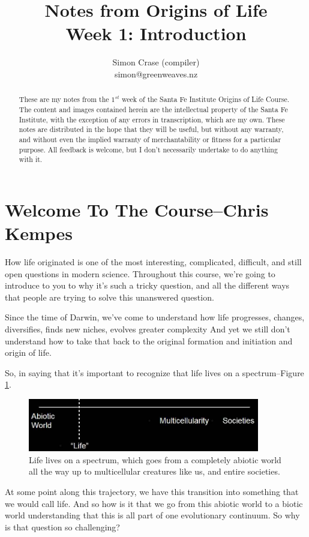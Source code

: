 \documentclass[]{article}
\title{
	Notes from Origins of Life\\
	Week 1: Introduction
}
\author{Simon Crase (compiler)\\simon@greenweaves.nz}
\begin{document}
\maketitle

\begin{abstract}
    These are my notes from the $1^{st}$ week of the Santa Fe Institute Origins of Life Course\cite{sfi2020}.\\
    The content and images contained herein are the intellectual property of the Santa Fe Institute, with the exception of any errors in transcription, which are my own.
    These notes are distributed in the hope that they will be useful,
    but without any warranty, and without even the implied warranty of
     merchantability or fitness for a particular purpose. All feedback is welcome,
    but I don't necessarily undertake to do anything with it.
\end{abstract}

\setcounter{tocdepth}{2}
\tableofcontents
\listoffigures

\section[Welcome To The Course]{Welcome To The Course--Chris Kempes}

How life originated is one of the most interesting, complicated, difficult, and still open questions in modern science. Throughout this course, we're going to
introduce to you to why it's such a tricky question, and all the different ways that people are trying to solve this unanswered question.	

Since the time of Darwin, we've come to understand how life progresses, changes, diversifies, finds new niches, evolves greater complexity And yet we still don't understand how to take that back to the original formation and initiation and origin of life.

So, in saying that it's important to recognize that life lives on a spectrum--Figure \ref{fig:lifesTransitions}.

\begin{figure}[H]
	\caption[Life lives on a spectrum]{Life lives on a spectrum, which goes from a completely abiotic world
		all the way up to multicellular creatures like us, and entire societies.}\label{fig:lifesTransitions}
	\includegraphics[width=0.9\textwidth]{lifesTransitions}
\end{figure}
At some point along this trajectory, we have this transition into something
that we would call life. And so how is it that we go from this
abiotic world to a biotic world understanding that this is all part of one
evolutionary continuum. So why is that question so challenging?
\end{document}
